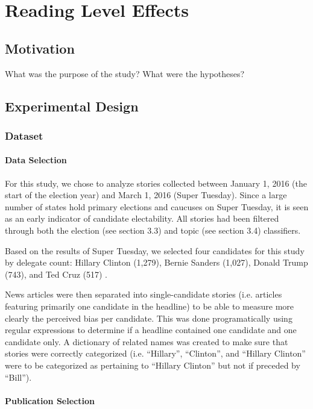 \chapter{Reading Level Effects}

\section{Motivation}

What was the purpose of the study?
What were the hypotheses? 

\section{Experimental Design} 

\subsection{Dataset}
    \subsubsection {Data Selection} 

    For this study, we chose to analyze stories collected between January 1, 2016 (the start of the election year) and March 1, 2016 (Super Tuesday). Since a large number of states hold primary elections and caucuses on Super Tuesday, it is seen as an early indicator of candidate electability. All stories had been filtered through both the election (see section 3.3) and topic (see section 3.4) classifiers.

    Based on the results of Super Tuesday, we selected four candidates for this study by delegate count: Hillary Clinton (1,279), Bernie Sanders (1,027), Donald Trump (743), and Ted Cruz (517) \cite{March45online}.

    News articles were then separated into single-candidate stories (i.e. articles featuring primarily one candidate in the headline) to be able to measure more clearly the perceived bias per candidate. This was done programatically using regular expressions to determine if a headline contained one candidate and one candidate only. A dictionary of related names was created to make sure that stories were correctly categorized (i.e. ``Hillary'', ``Clinton'', and ``Hillary Clinton'' were to be categorized as pertaining to ``Hillary Clinton'' but not if preceded by ``Bill'').

    \subsubsection {Publication Selection}

